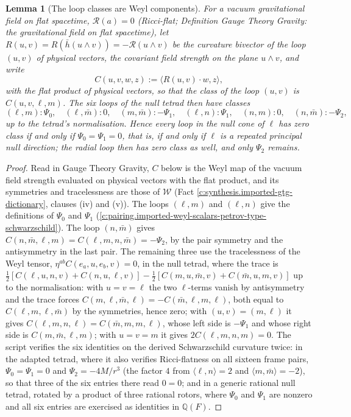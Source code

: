 \documentclass[11pt]{article}
\newtheorem{lemma}[theorem]{Lemma}
\theoremstyle{definition}
\theoremstyle{plain}
\providecommand{\Q}{}\renewcommand{\Q}{\mathbb{Q}}
\providecommand{\hb}{}\renewcommand{\hb}{\bar{h}}
\providecommand{\mb}{}\renewcommand{\mb}{\bar m}
\providecommand{\ip}{}\renewcommand{\ip}[2]{\langle #1, #2\rangle}
\begin{document}
\begin{lemma}[The loop classes are Weyl components]\label{c:pairing.loop-classes-are-weyl-components}
For a vacuum gravitational field on flat spacetime, $\mathcal{R}(a) = 0$ (Ricci-flat; Definition \emph{Gauge Theory Gravity: the gravitational field on flat spacetime}), let $R(u, v) = R(\hb(u \wedge v)) = -\mathcal{R}(u \wedge v)$ be the curvature bivector of the loop $(u, v)$ of physical vectors, the covariant field strength on the plane $u \wedge v$, and write
\[
C(u, v, w, z) := \ip{R(u, v)\cdot w}{z},
\]
with the flat product of physical vectors, so that the class of the loop $(u, v)$ is $C(u, v, \ell, m)$. The six loops of the null tetrad then have classes
\[
(\ell, m) : \Psi_{0}, \quad (\ell, \mb) : 0, \quad (m, \mb) : -\Psi_{1}, \quad (\ell, n) : \Psi_{1}, \quad (n, m) : 0, \quad (n, \mb) : -\Psi_{2},
\]
up to the tetrad's normalisation. Hence every loop in the null cone of $\ell$ has zero class if and only if $\Psi_{0} = \Psi_{1} = 0$, that is, if and only if $\ell$ is a repeated principal null direction; the radial loop then has zero class as well, and only $\Psi_{2}$ remains.
\end{lemma}
\begin{proof}
Read in Gauge Theory Gravity, $C$ below is the Weyl map of the vacuum field strength evaluated on physical vectors with the flat product, and its symmetries and tracelessness are those of $\mathcal{W}$ (Fact \ref{c:synthesis.imported-gtg-dictionary}, clauses (iv) and (v)). The loops $(\ell, m)$ and $(\ell, n)$ give the definitions of $\Psi_{0}$ and $\Psi_{1}$ (\ref{c:pairing.imported-weyl-scalars-petrov-type-schwarzschild}). The loop $(n, \mb)$ gives $C(n, \mb, \ell, m) = C(\ell, m, n, \mb) = -\Psi_{2}$, by the pair symmetry and the antisymmetry in the last pair. The remaining three use the tracelessness of the Weyl tensor, $\eta^{ab}C(e_{a}, u, e_{b}, v) = 0$, in the null tetrad, where the trace is $\tfrac12[C(\ell, u, n, v) + C(n, u, \ell, v)] - \tfrac12[C(m, u, \mb, v) + C(\mb, u, m, v)]$ up to the normalisation: with $u = v = \ell$ the two $\ell$-terms vanish by antisymmetry and the trace forces $C(m, \ell, \mb, \ell) = -C(\mb, \ell, m, \ell)$, both equal to $C(\ell, m, \ell, \mb)$ by the symmetries, hence zero; with $(u, v) = (m, \ell)$ it gives $C(\ell, m, n, \ell) = C(\mb, m, m, \ell)$, whose left side is $-\Psi_{1}$ and whose right side is $C(m, \mb, \ell, m)$; with $u = v = m$ it gives $2C(\ell, m, n, m) = 0$. The script verifies the six identities on the derived Schwarzschild curvature twice: in the adapted tetrad, where it also verifies Ricci-flatness on all sixteen frame pairs, $\Psi_{0} = \Psi_{1} = 0$ and $\Psi_{2} = -4M/r^{3}$ (the factor $4$ from $\ip{\ell}{n} = 2$ and $\ip{m}{\mb} = -2$), so that three of the six entries there read $0 = 0$; and in a generic rational null tetrad, rotated by a product of three rational rotors, where $\Psi_{0}$ and $\Psi_{1}$ are nonzero and all six entries are exercised as identities in $\Q(F)$.

\end{proof}
\end{document}
